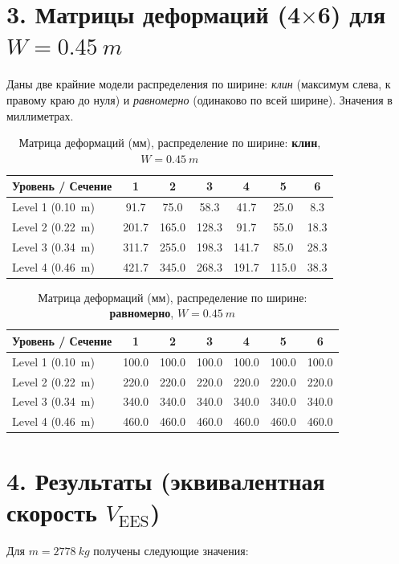 \documentclass[12pt,a4paper]{article}
\begin{document}
	\section*{3. Матрицы деформаций (4$\times$6) для $W=\SI{0.45}{m}$}
	Даны две крайние модели распределения по ширине: \emph{клин} (максимум слева, к правому краю до нуля) и \emph{равномерно} (одинаково по всей ширине). Значения в миллиметрах.
	
	\begin{table}[h]
		\centering\small
		\caption{Матрица деформаций (мм), распределение по ширине: \textbf{клин}, $W=\SI{0.45}{m}$}
		\begin{tabular}{lcccccc}
			\toprule
			Уровень / Сечение & 1 & 2 & 3 & 4 & 5 & 6\\
			\midrule
			Level 1 (\SI{0.10}{m}) & 91.7 & 75.0 & 58.3 & 41.7 & 25.0 & 8.3\\
			Level 2 (\SI{0.22}{m}) & 201.7 & 165.0 & 128.3 & 91.7 & 55.0 & 18.3\\
			Level 3 (\SI{0.34}{m}) & 311.7 & 255.0 & 198.3 & 141.7 & 85.0 & 28.3\\
			Level 4 (\SI{0.46}{m}) & 421.7 & 345.0 & 268.3 & 191.7 & 115.0 & 38.3\\
			\bottomrule
		\end{tabular}
	\end{table}
	
	\begin{table}[h]
		\centering\small
		\caption{Матрица деформаций (мм), распределение по ширине: \textbf{равномерно}, $W=\SI{0.45}{m}$}
		\begin{tabular}{lcccccc}
			\toprule
			Уровень / Сечение & 1 & 2 & 3 & 4 & 5 & 6\\
			\midrule
			Level 1 (\SI{0.10}{m}) & 100.0 & 100.0 & 100.0 & 100.0 & 100.0 & 100.0\\
			Level 2 (\SI{0.22}{m}) & 220.0 & 220.0 & 220.0 & 220.0 & 220.0 & 220.0\\
			Level 3 (\SI{0.34}{m}) & 340.0 & 340.0 & 340.0 & 340.0 & 340.0 & 340.0\\
			Level 4 (\SI{0.46}{m}) & 460.0 & 460.0 & 460.0 & 460.0 & 460.0 & 460.0\\
			\bottomrule
		\end{tabular}
	\end{table}
	
	\section*{4. Результаты (эквивалентная скорость $V_{\text{EES}}$)}
	Для $m=\SI{2778}{kg}$ получены следующие значения:
	
\end{document}
